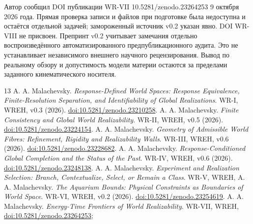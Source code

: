 {Автор сообщил DOI публикации WR-VII 10.5281/zenodo.23264253 9 октября 2026 года. Прямая проверка записи и файлов при подготовке была недоступна и остаётся отдельной задачей; замороженный источник v0.2 указан явно. DOI WR-VIII не присвоен. Препринт v0.2 учитывает замечания отдельно воспроизведённого автоматизированного предпубликационного аудита. Это не устанавливает независимого внешнего научного рецензирования. Вывод по реальному обзору и допустимость модели материи остаются за пределами заданного кинематического носителя.}

\begingroup\small\raggedright
\begin{thebibliography}{13}\setlength{\itemsep}{2pt}\setlength{\parsep}{0pt}
 A. A. Malachevsky. \emph{Response-Defined World Spaces: Response Equivalence, Finite-Resolution Separation, and Identifiability of Global Realizations}. WR-I, WREH, v0.3 (2026). \href{https://doi.org/10.5281/zenodo.23210258}{doi:10.5281/zenodo.23210258}.
 A. A. Malachevsky. \emph{Finite Consistency and Global World Realizability}. WR-II, WREH, v0.5 (2026). \href{https://doi.org/10.5281/zenodo.23224154}{doi:10.5281/zenodo.23224154}.
 A. A. Malachevsky. \emph{Geometry of Admissible World Fibres: Refinement, Rigidity and Realizability Walls}. WR-III, WREH, v0.6 (2026). \href{https://doi.org/10.5281/zenodo.23228682}{doi:10.5281/zenodo.23228682}.
 A. A. Malachevsky. \emph{Response-Conditioned Global Completion and the Status of the Past}. WR-IV, WREH, v0.6 (2026). \href{https://doi.org/10.5281/zenodo.23248138}{doi:10.5281/zenodo.23248138}.
 A. A. Malachevsky. \emph{Experiment and Realization Selection: Branch, Contextualize, Select, or Remain a Class}. WR-V, WREH, 
 A. A. Malachevsky. \emph{The Aquarium Bounds: Physical Constraints as Boundaries of World Space}. WR-VI, WREH, v0.2 (2026). \href{https://doi.org/10.5281/zenodo.23254619}{doi:10.5281/zenodo.23254619}.
 A. A. Malachevsky. \emph{Energy-Time Frontiers of World Realizability}. WR-VII, WREH,  \href{https://doi.org/10.5281/zenodo.23264253}{doi:10.5281/zenodo.23264253}; 

\end{thebibliography}
